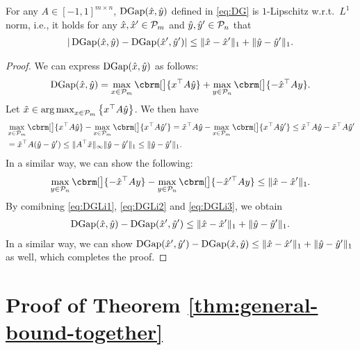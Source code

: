 \begin{lemma}
    \label{lem:DGLipschitz}
    For any $A \in [-1, 1]^{m \times n}$,
    $\operatorname{DGap}(\hat{x},\hat{y})$ defined in \eqref{eq:DG}
    is $1$-Lipschitz w.r.t.~$L^1$ norm,
    i.e.,
    it holds for any 
    $\hat{x}, \hat{x}' \in \mathcal{P}_m$ and
    $\hat{y}, \hat{y}' \in \mathcal{P}_n$ that
    \begin{align}
        |
        \operatorname{DGap}( \hat{x}, \hat{y} )
        -
        \operatorname{DGap}( \hat{x}', \hat{y}' )
        |
        \le
        \| \hat{x} - \hat{x}' \|_1
        +
        \| \hat{y} - \hat{y}' \|_1.
    \end{align}
\end{lemma}
\begin{proof}
    We can express $\operatorname{DGap}(\hat{x}, \hat{y})$ as follows:
    \begin{align}
        \DG( \hat{x}, \hat{y} )
        =
        \max_{x \in \cP_m} \cbrm[\big]{ x^\top A \hat{y} }
        +
        \max_{y \in \cP_n} \cbrm[\big]{ - \hat{x}^\top A {y} }.
        \label{eq:DGLi1}
    \end{align}
    Let $\tilde{x} \in \operatorname*{arg\,max}_{ x \in \mathcal{P}_m }\left\{ x^\top A \hat{y} \right\}$.
    We then have
    \begin{align}
        &
        \max_{x \in \cP_m} \cbrm[\big]{ x^\top A \hat{y} }
        -
        \max_{x \in \cP_m} \cbrm[\big]{ x^\top A \hat{y}' }
        =
        \tilde{x}^\top A \hat{y} 
        -
        \max_{x \in \cP_m} \cbrm[\big]{ x^\top A \hat{y}' }
        \le
        \tilde{x}^\top A \hat{y} 
        -
        \tilde{x}^\top A \hat{y}' 
        \\
        &
        =
        \tilde{x}^\top A (\hat{y} - \hat{y}')
        \le
        \| A^\top \tilde{x} \|_{\infty} 
        \| \hat{y} - \hat{y}' \|_1
        \le
        \| \hat{y} - \hat{y}' \|_1.
        \label{eq:DGLi2}
    \end{align}
    In a similar way,
    we can show the following:
    \begin{align}
        \max_{y \in \cP_n} \cbrm[\big]{ - \hat{x}^\top A {y} }
        -
        \max_{y \in \cP_n} \cbrm[\big]{ - \hat{x}'^\top A {y} }
        \le
        \| \hat{x} - \hat{x}' \|_1.
        \label{eq:DGLi3}
    \end{align}
    By comibning \eqref{eq:DGLi1}, \eqref{eq:DGLi2} and \eqref{eq:DGLi3},
    we obtain
    \begin{align}
        \operatorname{DGap}( \hat{x}, \hat{y} )
        -
        \operatorname{DGap}( \hat{x}', \hat{y}' )
        \le
        \| \hat{x} - \hat{x}' \|_1
        +
        \| \hat{y} - \hat{y}' \|_1.
    \end{align}
    In a similar way,
    we can show
    $
        \operatorname{DGap}( \hat{x}', \hat{y}' )
        -
        \operatorname{DGap}( \hat{x}, \hat{y} )
        \le
        \| \hat{x} - \hat{x}' \|_1
        +
        \| \hat{y} - \hat{y}' \|_1
    $
    as well,
    which completes the proof.
\end{proof}


\section{Proof of Theorem \ref{thm:general-bound-together}}\label{sec:app:proof-thm2}









